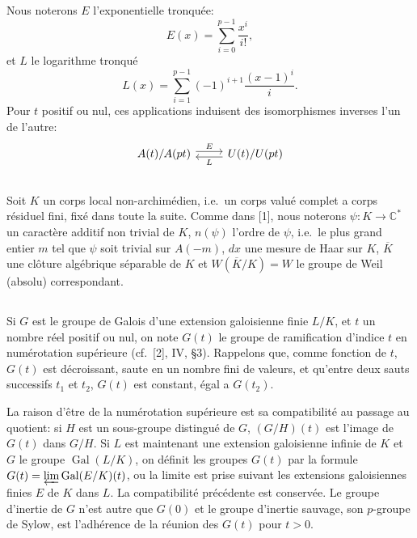 \documentclass[12pt,a4paper]{article}
\theoremstyle{plain}
\theoremstyle{definition}
\theoremstyle{remark}
\newcommand{\bC}{\mathbb{C}}
\providecommand{\Gal}{\operatorname{Gal}}
\begin{document}
\subsection{}
\label{sec:0.2}

Nous noterons $E$ l'exponentielle tronqu\'ee:
\[
E(x) = \sum_{i=0}^{p-1} \frac{x^i}{i!},
\]
et $L$ le logarithme tronqu\'e
\[
L(x) = \sum_{i=1}^{p-1} (-1)^{i+1} \frac{(x-1)^i}{i}.
\]
Pour $t$ positif ou nul, ces applications induisent des isomorphismes inverses l'un de l'autre:
\[
\begin{tikzcd}
A(t)/A(pt) \arrow[r, shift left, "E"] & U(t)/U(pt) \arrow[l, shift left, "L"]
\end{tikzcd}
\]

\subsection{}
\label{sec:0.3}

Soit $K$ un corps local non-archim\'edien, i.e.~un corps valu\'e complet a corps r\'esiduel fini, fix\'e dans toute la suite. Comme dans [1], nous noterons $\psi: K \to \bC^*$ un caract\`ere additif non trivial de $K$, $n(\psi)$ l'ordre de $\psi$, i.e.~le plus grand entier $m$ tel que $\psi$ soit trivial sur $A(-m)$, $dx$ une mesure de Haar sur $K$, $\overline{K}$ une cl\^oture alg\'ebrique s\'eparable de $K$ et $W(\overline{K}/K) = W$ le groupe de Weil (absolu) correspondant.

\subsection{}
\label{sec:0.4}

Si $G$ est le groupe de Galois d'une extension galoisienne finie $L/K$, et $t$ un nombre r\'eel positif ou nul, on note $G(t)$ le groupe de ramification d'indice $t$ en num\'erotation sup\'erieure (cf.~[2], IV, \S 3). Rappelons que, comme fonction de $t$, $G(t)$ est d\'ecroissant, saute en un nombre fini de valeurs, et qu'entre deux sauts successifs $t_1$ et $t_2$, $G(t)$ est constant, \'egal a $G(t_2)$.

La raison d'\^etre de la num\'erotation sup\'erieure est sa compatibilit\'e au passage au quotient: si $H$ est un sous-groupe distingu\'e de $G$, $(G/H)(t)$ est l'image de $G(t)$ dans $G/H$. Si $L$ est maintenant une extension galoisienne infinie de $K$ et $G$ le groupe $\Gal(L/K)$, on d\'efinit les groupes $G(t)$ par la formule $G(t) = \varprojlim \Gal(E/K)(t)$, ou la limite est prise suivant les extensions galoisiennes finies $E$ de $K$ dans $L$. La compatibilit\'e pr\'ec\'edente est conserv\'ee. Le groupe d'inertie de $G$ n'est autre que $G(0)$ et le groupe d'inertie sauvage, son $p$-groupe de Sylow, est l'adh\'erence de la r\'eunion des $G(t)$ pour $t > 0$.
\end{document}
